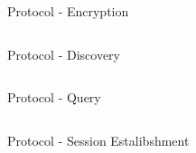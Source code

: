 \documentclass[a4paper]{beamer}
\begin{document}
\begin{frame}[fragile]{Protocol - Encryption}
    \begin{columns}[t]
        \begin{column}{0.44\textwidth}
            
        \end{column}
    \end{columns}
\end{frame}

\begin{frame}{Protocol - Discovery}
    \begin{columns}[t]
        \begin{column}{0.44\textwidth}
            
        \end{column}
        \begin{column}{0.44\textwidth}
            
        \end{column}
    \end{columns}
\end{frame}

\begin{frame}{Protocol - Query}
    \begin{columns}[t]
        \begin{column}{0.44\textwidth}
        \end{column}
        \begin{column}{0.44\textwidth}
            
        \end{column}
    \end{columns}
\end{frame}

\begin{frame}{Protocol - Session Estalibshment}
    \begin{columns}[t]
        \begin{column}{0.48\textwidth}
            
        \end{column}
        \begin{column}{0.40\textwidth}
            
        \end{column}
    \end{columns}
\end{frame}
\end{document}

